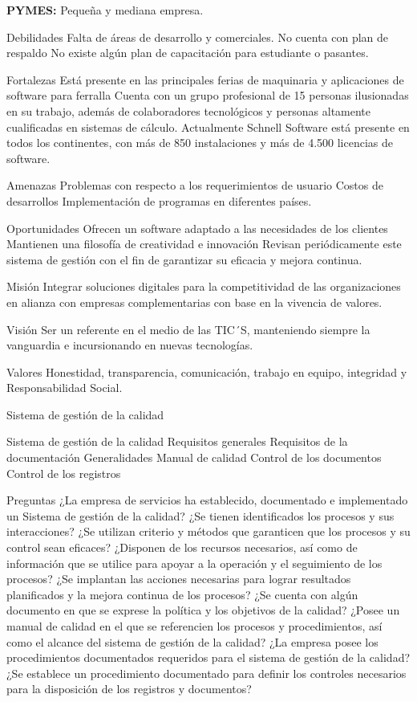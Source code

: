 \documentclass[10pt,a4paper]{article}
\begin{document}
\begin{enumerate}
\textbf{PYMES: }Pequeña y mediana empresa.



Debilidades
Falta de áreas de desarrollo y comerciales.
No cuenta con plan de respaldo
No existe algún plan de capacitación para estudiante o pasantes.

Fortalezas
Está presente en las principales ferias de maquinaria y aplicaciones de software para ferralla
Cuenta con un grupo profesional de 15 personas ilusionadas en su trabajo, además de colaboradores tecnológicos y personas altamente cualificadas en sistemas de cálculo.
Actualmente Schnell Software está presente en todos los continentes, con más de 850 instalaciones y más de 4.500 licencias de software.

Amenazas
Problemas con respecto a los requerimientos de usuario
Costos de desarrollos 
Implementación de programas en diferentes países.

Oportunidades
Ofrecen un software adaptado a las necesidades de los clientes
Mantienen una filosofía de creatividad e innovación 
Revisan periódicamente este sistema de gestión con el fin de garantizar su eficacia y mejora continua.

Misión
Integrar soluciones digitales para la competitividad de las organizaciones en alianza con empresas complementarias con base en la vivencia de valores.

Visión
Ser un referente en el medio de las TIC´S, manteniendo siempre la vanguardia e incursionando en nuevas tecnologías.
 
Valores
Honestidad, transparencia, comunicación, trabajo en equipo, integridad y Responsabilidad Social.

Sistema de gestión de la calidad

Sistema de gestión de la calidad
Requisitos generales
Requisitos de la documentación
Generalidades
Manual de calidad
Control de los documentos
Control de los registros

Preguntas
¿La empresa de servicios ha establecido, documentado e implementado un Sistema de gestión de la calidad? 
¿Se tienen identificados los procesos y sus interacciones?
¿Se utilizan criterio y métodos que garanticen que los procesos y su control sean eficaces?
¿Disponen de los recursos necesarios, así como de información que se utilice para apoyar a la operación y el seguimiento de los procesos?
¿Se implantan las acciones necesarias para lograr resultados planificados y la mejora continua de los procesos? 
¿Se cuenta con algún documento en que se exprese la política y los objetivos de la calidad?
¿Posee un manual de calidad en el que se referencien los procesos y procedimientos, así como el alcance del sistema de gestión de la calidad?
¿La empresa posee los procedimientos documentados requeridos para el sistema de gestión de la calidad?
¿Se establece un procedimiento documentado para definir los controles necesarios para la disposición de los registros y documentos? 
\end{enumerate}
\end{document}
